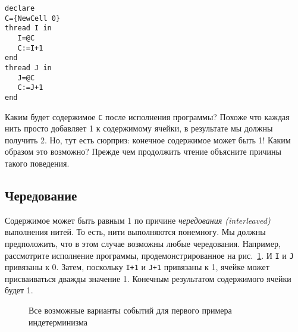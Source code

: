 \begin{lstlisting}
declare
C={NewCell 0}
thread I in
   I=@C
   C:=I+1
end
thread J in
   J=@C
   C:=J+1
end
\end{lstlisting}

Каким будет содержимое \lstinline|C| после исполнения программы? Похоже что каждая нить просто добавляет 1 к содержимому ячейки, в результате мы должны получить 2. Но, тут есть сюрприз: конечное содержимое может быть 1! Каким образом это возможно? Прежде чем продолжить чтение объясните причины такого поведения.

\subsection{Чередование}

Содержимое может быть равным 1 по причине \emph{чередования (interleaved)} выполнения нитей. То есть, нити выполняются понемногу. Мы должны предположить, что в этом случае возможны любые чередования. Например, рассмотрите исполнение программы, продемонстрированное на рис.~\ref{figure:Execution_second_nondeterm_example}. И \lstinline|I| и \lstinline|J| привязаны к 0. Затем, поскольку \lstinline|I+1| и \lstinline|J+1| привязаны к 1, ячейке может присваиваться дважды значение 1. Конечным результатом содержимого ячейки будет 1.

\begin{figure}
\caption{Все возможные варианты событий для первого примера индетерминизма}
\label{figure:Execution_second_nondeterm_example}
\end{figure}


